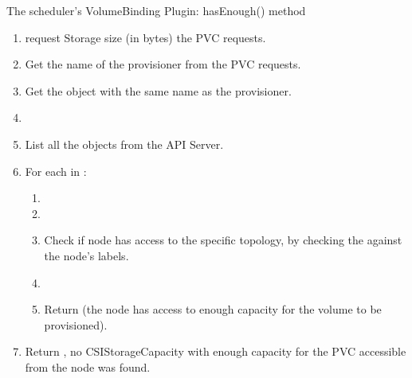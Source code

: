 \begin{algorithm}[h]
      \caption{The scheduler's VolumeBinding Plugin: hasEnough() method}
      \label{alg:vol-binding-has-enough}
      \begin{enumerate}[leftmargin=0.5cm]
            \tightlist
            \item request \lar Storage size (in bytes) the PVC requests.
            \item Get the name of the provisioner from  the PVC requests.
            \item Get the  object with the same name as the provisioner.
            \item {}
            \item {} \lar List all the  objects from the API Server.
            \item For each  in :
                  \begin{enumerate}
                        \item {}
                        \item {}
                        \item Check if node has access to the specific topology, by checking the  against the node's labels.
                        \item {}
                        \item Return  (the node has access to enough capacity for the volume to be provisioned).
                  \end{enumerate}
            \item Return , no CSIStorageCapacity with enough capacity for the PVC accessible from the node was found.
      \end{enumerate}
\end{algorithm}